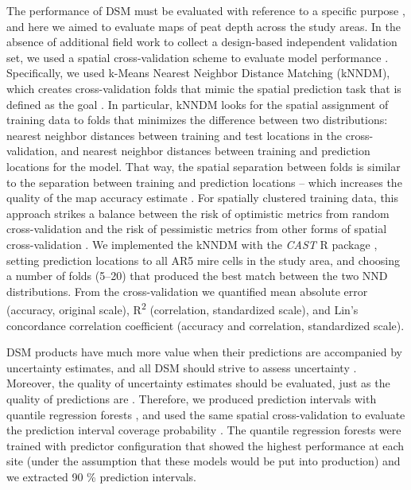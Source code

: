 \documentclass[soil, manuscript]{copernicus}
\begin{document}
The performance of DSM must be evaluated with reference to a specific purpose \citep[i.e., map vs.~model validation, interpolation vs.~extrapolation,][]{robertsCrossvalidationStrategiesData2017, milaNearestNeighbourDistance2022}, and here we aimed to evaluate maps of peat depth across the study areas.
In the absence of additional field work to collect a design-based independent validation set, we used a spatial cross-validation scheme to evaluate model performance \citep{wadouxSpatialCrossvalidationNot2021, meyerMachineLearningbasedGlobal2022}.
Specifically, we used k-Means Nearest Neighbor Distance Matching (kNNDM), which creates cross-validation folds that mimic the spatial prediction task that is defined as the goal \citep{linnenbrinkKNNDMCVKfold2024}.
In particular, kNNDM looks for the spatial assignment of training data to folds that minimizes the difference between two distributions: nearest neighbor distances between training and test locations in the cross-validation, and nearest neighbor distances between training and prediction locations for the model.
That way, the spatial separation between folds is similar to the separation between training and prediction locations -- which increases the quality of the map accuracy estimate \citep{linnenbrinkKNNDMCVKfold2024}.
For spatially clustered training data, this approach strikes a balance between the risk of optimistic metrics from random cross-validation and the risk of pessimistic metrics from other forms of spatial cross-validation \citep{wadouxSpatialCrossvalidationNot2021}.
We implemented the kNNDM with the \emph{CAST} R package \citep[v.1.0.2,][]{meyerCASTPackageTraining2024}, setting prediction locations to all AR5 mire cells in the study area, and choosing a number of folds (5--20) that produced the best match between the two NND distributions.
From the cross-validation we quantified mean absolute error (accuracy, original scale), R\textsuperscript{2} (correlation, standardized scale), and Lin's concordance correlation coefficient (accuracy and correlation, standardized scale).

DSM products have much more value when their predictions are accompanied by uncertainty estimates, and all DSM should strive to assess uncertainty \citep{arrouaysImpressionsDigitalSoil2020, wadouxMachineLearningDigital2020}.
Moreover, the quality of uncertainty estimates should be evaluated, just as the quality of predictions are \citep{heuvelinkSpatialStatisticsSoil2022}.
Therefore, we produced prediction intervals with quantile regression forests \citep{meinshausenQuantileRegressionForests2006}, and used the same spatial cross-validation to evaluate the prediction interval coverage probability \citep{shresthaMachineLearningApproaches2006}.
The quantile regression forests were trained with predictor configuration that showed the highest performance at each site (under the assumption that these models would be put into production) and we extracted 90 \% prediction intervals.
\end{document}
